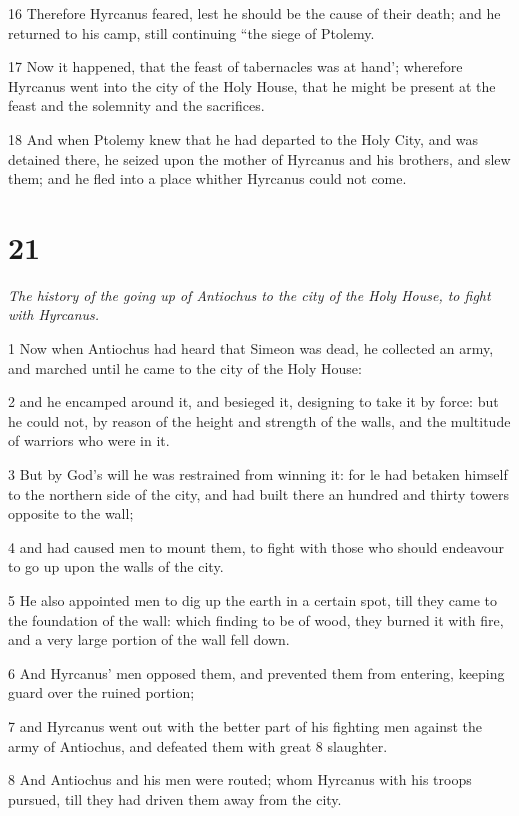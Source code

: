 16 Therefore Hyrcanus feared, lest he should be the cause of their death; and he returned to his camp, still continuing “the siege of Ptolemy. 

17 Now it happened, that the feast of tabernacles was at hand’; wherefore Hyrcanus went into the city of the Holy House, that he might be present at the feast and the solemnity and the sacrifices. 

18 And when Ptolemy knew that he had departed to the Holy City, and was detained there, he seized upon the mother of Hyrcanus and his brothers, and slew them; and he fled into a place whither Hyrcanus could not come. 



\chapter{21}

\par \textit{The history of the going up of Antiochus to the city of the Holy House, to fight with Hyrcanus.}

1 Now when Antiochus had heard that Simeon was dead, he collected an army, and marched until he came to the city of the Holy House: 

2 and he encamped around it, and besieged it, designing to take it by force: but he could not, by reason of the height and strength of the walls, and the multitude of warriors who were in it. 

3 But by God’s will he was restrained from winning it: for le had betaken himself to the northern side of the city, and had built there an hundred and thirty towers opposite to the wall; 

4 and had caused men to mount them, to fight with those who should endeavour to go up upon the walls of the city. 

5 He also appointed men to dig up the earth in a certain spot, till they came to the foundation of the wall: which finding to be of wood, they burned it with fire, and a very large portion of the wall fell down. 

6 And Hyrcanus’ men opposed them, and prevented them from entering, keeping guard over the ruined portion; 

7 and Hyrcanus went out with the better part of his fighting men against the army of Antiochus, and defeated them with great 8 slaughter. 

8 And Antiochus and his men were routed; whom Hyrcanus with his troops pursued, till they had driven them away from the city. 

